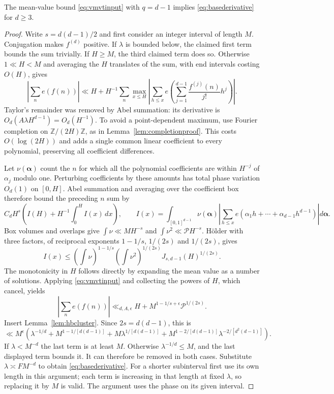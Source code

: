\begin{proposition}
\label{prop:hbderivativeproof}
The mean-value bound \eqref{eq:vmvtinput} with $q=d-1$ implies
\eqref{eq:basederivative} for $d\ge3$.
\end{proposition}
\begin{proof}
Write $s=d(d-1)/2$ and first consider an integer interval of length $M$.
Conjugation makes $f^{(d)}$ positive. If $\lambda$ is bounded below,
the claimed first term bounds the sum trivially. If $H\ge M$, the
third claimed term does so. Otherwise $1\ll H<M$ and averaging
the $H$ translates of the sum, with end intervals costing $O(H)$, gives
\[
 \left|\sum_ne(f(n))\right|
 \ll H+H^{-1}\sum_n\max_{x\le H}
 \left|\sum_{h\le x}e\left(\sum_{j=1}^{d-1}\frac{f^{(j)}(n)}{j!}h^j\right)\right|.
\]
Taylor's remainder was removed by Abel summation: its derivative is
$O_d(A\lambda H^{d-1})=O_d(H^{-1})$.
To avoid a point-dependent maximum, use Fourier completion on
$\mathbb Z/(2H)\mathbb Z$, as in Lemma~\ref{lem:completionproof}.
This costs $O(\log(2H))$ and adds a single common linear coefficient
to every polynomial, preserving all coefficient differences.

Let $\nu(\boldsymbol\alpha)$ count the $n$ for which all the polynomial
coefficients are within $H^{-j}$ of $\alpha_j$ modulo one. Perturbing
coefficients by these amounts has total phase variation $O_d(1)$
on $[0,H]$. Abel summation and averaging over the coefficient box
therefore bound the preceding $n$ sum by
\[
 C_dH^s\left(I(H)+H^{-1}\int_0^H I(x)\,dx\right),\qquad
 I(x)=\int_{[0,1]^{d-1}}\nu(\boldsymbol\alpha)
 \left|\sum_{h\le x}e(\alpha_1h+\cdots+\alpha_{d-1}h^{d-1})\right|
 d\boldsymbol\alpha.
\]
Box volumes and overlaps give
$\int\nu\ll MH^{-s}$ and $\int\nu^2\ll\mathcal P H^{-s}$.
H\"older with three factors, of reciprocal exponents
$1-1/s$, $1/(2s)$ and $1/(2s)$, gives
\[
 I(x)\le(\int\nu)^{1-1/s}(\int\nu^2)^{1/(2s)}
 J_{s,d-1}(H)^{1/(2s)}.
\]
The monotonicity in $H$ follows directly by expanding the mean value
as a number of solutions. Applying \eqref{eq:vmvtinput} and collecting
the powers of $H$, which cancel, yields
\[
 \left|\sum_ne(f(n))\right|
 \ll_{d,A,\epsilon}H+M^{1-1/s+\epsilon}\mathcal P^{1/(2s)}.
\]
Insert Lemma~\ref{lem:hbcluster}. Since $2s=d(d-1)$, this is
\[
 \ll M^\epsilon\left(\lambda^{-1/d}
 +M^{1-1/[d(d-1)]}+M\lambda^{1/[d(d-1)]}
 +M^{1-2/[d(d-1)]}\lambda^{-2/[d^2(d-1)]}\right).
\]
If $\lambda<M^{-d}$ the last term is at least $M$. Otherwise
$\lambda^{-1/d}\le M$, and the last displayed term bounds it. It can therefore be removed in both cases. Substitute
$\lambda\asymp FM^{-d}$ to obtain \eqref{eq:basederivative}.
For a shorter subinterval first use its own length in this argument;
each term is increasing in that length at fixed $\lambda$, so replacing
it by $M$ is valid. The argument uses the phase on its given interval.
\end{proof}
